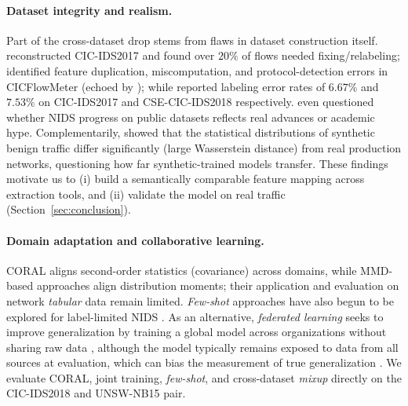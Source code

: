 \documentclass[preprint,12pt,authoryear]{elsarticle}
\begin{document}
\paragraph{Dataset integrity and realism.} Part of the cross-dataset drop stems
from flaws in dataset construction itself. \citet{engelen} reconstructed
CIC-IDS2017 and found over $20\%$ of flows needed fixing/relabeling; \citet{rosay}
identified feature duplication, miscomputation, and protocol-detection errors in
CICFlowMeter (echoed by \citet{lanvin}); while \citet{liu} reported labeling error
rates of $6.67\%$ and $7.53\%$ on CIC-IDS2017 and CSE-CIC-IDS2018 respectively.
\citet{catillo} even questioned whether NIDS progress on public datasets reflects
real advances or academic hype. Complementarily, \citet{layeghy} showed that the
statistical distributions of synthetic benign traffic differ significantly (large
Wasserstein distance) from real production networks, questioning how far
synthetic-trained models transfer. These findings motivate us to (i) build a
semantically comparable feature mapping across extraction tools, and (ii) validate
the model on real traffic (Section~\ref{sec:conclusion}).

\paragraph{Domain adaptation and collaborative learning.} CORAL \citep{coral}
aligns second-order statistics (covariance) across domains, while MMD-based
approaches align distribution moments; their application and evaluation on
network \emph{tabular} data remain limited. \emph{Few-shot} approaches have also
begun to be explored for label-limited NIDS \citep{fewshot}. As an alternative,
\emph{federated learning} seeks to improve generalization by training a global
model across organizations without sharing raw data
\citep{nidsfgpa,popoola,bertoli,agrawal}, although the model typically remains
exposed to data from all sources at evaluation, which can bias the measurement of
true generalization \citep{cantone}. We evaluate CORAL, joint training,
\emph{few-shot}, and cross-dataset \emph{mixup} directly on the CIC-IDS2018 and
UNSW-NB15 pair.
\end{document}
